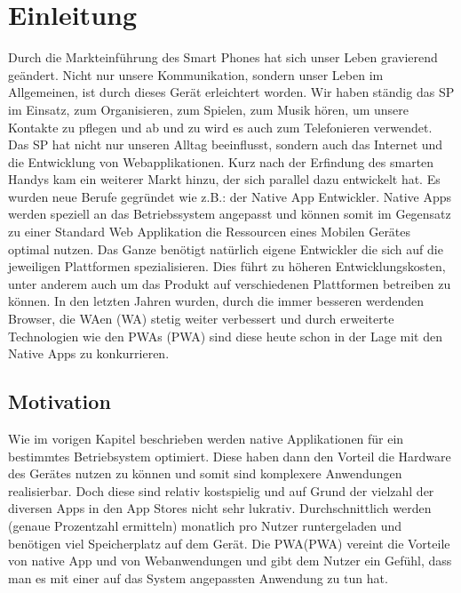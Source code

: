 \chapter{Einleitung}\label{chap:Einleitung}
\thispagestyle{standard}
\pagestyle{standard}
\renewcommand{\footrulewidth}{0.4pt}

Durch die Markteinführung des Smart Phones hat sich unser Leben gravierend geändert. 
Nicht nur unsere Kommunikation, sondern unser Leben im Allgemeinen, ist durch dieses Gerät erleichtert worden.
Wir haben ständig das \acs{SP} im Einsatz, zum Organisieren, zum Spielen, zum Musik hören, um unsere Kontakte zu pflegen und ab und zu wird es auch zum Telefonieren verwendet.
Das \acs{SP} hat nicht nur unseren Alltag beeinflusst, sondern auch das Internet und die Entwicklung von Webapplikationen. Kurz nach der Erfindung des smarten Handys kam ein weiterer Markt 
hinzu, der sich parallel dazu entwickelt hat. Es wurden neue Berufe gegründet wie z.B.: der Native App Entwickler.
Native Apps werden speziell an das Betriebssystem angepasst und können somit im Gegensatz zu einer Standard Web Applikation die Ressourcen eines Mobilen Gerätes optimal nutzen.
Das Ganze benötigt natürlich eigene Entwickler die sich auf die jeweiligen Plattformen spezialisieren.
Dies führt zu höheren Entwicklungskosten, unter anderem auch um das Produkt auf verschiedenen Plattformen betreiben zu können.
In den letzten Jahren wurden, durch die immer besseren werdenden Browser, die \acl{WA}en (\acs{WA}) stetig weiter verbessert und durch 
erweiterte Technologien wie den \acl{PWA}s (\acs{PWA}) sind diese heute schon in der Lage mit den Native Apps zu konkurrieren. 




\section{Motivation} \label{sub:Motivation}
Wie im vorigen Kapitel beschrieben werden native Applikationen für ein bestimmtes Betriebsystem optimiert. Diese haben dann den Vorteil die Hardware des Gerätes nutzen zu können und somit sind komplexere Anwendungen realisierbar. Doch diese sind relativ kostspielig und auf Grund der vielzahl der diversen Apps in den App Stores nicht sehr lukrativ.
Durchschnittlich werden (genaue Prozentzahl ermitteln) monatlich pro Nutzer runtergeladen und benötigen viel Speicherplatz auf dem Gerät.
Die \acl{PWA}(\acs{PWA}) vereint die Vorteile von native App und von Webanwendungen und gibt dem Nutzer ein Gefühl, dass man es mit einer auf das System angepassten Anwendung zu tun hat.





